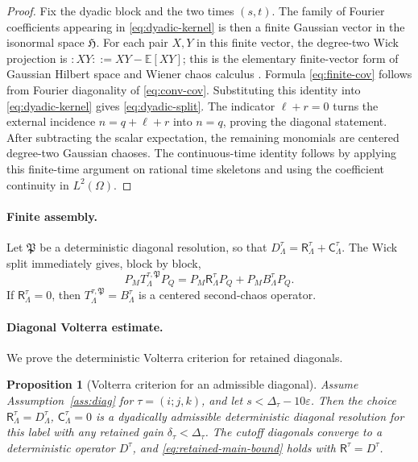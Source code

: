 \documentclass[11pt,reqno]{amsart}
\numberwithin{equation}{section}
\theoremstyle{plain}
\newtheorem{proposition}[theorem]{Proposition}
\theoremstyle{definition}
\newcommand{\E}{\mathbb E}
\newcommand{\eps}{\varepsilon}
\newcommand{\wick}[1]{:#1:}
\newcommand{\Ret}{\mathsf R}
\newcommand{\Ctr}{\mathsf C}
\begin{document}
\begin{proof}
Fix the dyadic block and the two times \((s,t)\).  The family of Fourier
coefficients appearing in \eqref{eq:dyadic-kernel} is then a finite Gaussian
vector in the isonormal space \(\mathfrak H\).  For each pair \(X,Y\) in this
finite vector, the degree-two Wick projection is
\(\wick{XY}:=XY-\E[XY]\); this is the elementary finite-vector form of
Gaussian Hilbert space and Wiener chaos calculus
\cite{Janson,Nualart,PeccatiTaqqu}.  Formula \eqref{eq:finite-cov} follows
from Fourier diagonality of \eqref{eq:conv-cov}.  Substituting this identity
into \eqref{eq:dyadic-kernel} gives \eqref{eq:dyadic-split}.  The indicator
\(\ell+r=0\) turns the external incidence \(n=q+\ell+r\) into \(n=q\),
proving the diagonal statement.  After subtracting the scalar expectation,
the remaining monomials are centered degree-two Gaussian chaoses.  The
continuous-time identity follows by applying this finite-time argument on
rational time skeletons and using the coefficient continuity in
\(L^2(\Omega)\).
\end{proof}

\paragraph{Finite assembly.}
Let \(\mathfrak P\) be a deterministic diagonal resolution, so that
\(D^\tau_\Lambda=\Ret^\tau_\Lambda+\Ctr^\tau_\Lambda\).  The Wick split
immediately gives, block by block,
\begin{equation}\label{eq:finite-ren-equals-B}
        P_MT_{\Lambda}^{\tau,\mathfrak P}P_Q
        =P_M\Ret^\tau_\Lambda P_Q+P_MB^\tau_\Lambda P_Q .
\end{equation}
If \(\Ret^\tau_\Lambda=0\), then
\(T_{\Lambda}^{\tau,\mathfrak P}=B^\tau_\Lambda\) is a centered
second-chaos operator.

\paragraph{Diagonal Volterra estimate.}
We prove the deterministic Volterra criterion for retained diagonals.

\begin{proposition}[Volterra criterion for an admissible diagonal]\label{prop:diagonal}
Assume Assumption~\ref{ass:diag} for \(\tau=(i;j,k)\), and let \(s<\Delta_\tau-10\eps\).  Then the choice \(\Ret^\tau_\Lambda=D^\tau_\Lambda\), \(\Ctr^\tau_\Lambda=0\) is a dyadically admissible deterministic diagonal resolution for this label with any retained gain \(\delta_\tau<\Delta_\tau\).  The cutoff diagonals converge to a deterministic operator \(D^\tau\), and \eqref{eq:retained-main-bound} holds with \(\Ret^\tau=D^\tau\).
\end{proposition}
\end{document}
